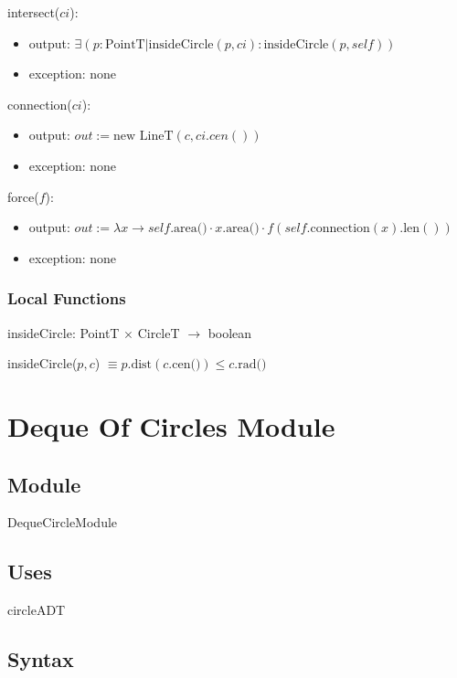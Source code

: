 \documentclass[12pt,fleqn]{article}
\begin{document}
\noindent intersect($ci$):
\begin{itemize}
\item output: $\exists ( p: \mbox{PointT} | \mbox{insideCircle}(p, ci) : \mbox{insideCircle}(p, \mathit{self}))$
\item exception: none
\end{itemize}

\noindent connection($ci$):
\begin{itemize}
\item output: $out := \mbox{new~} \mbox{LineT} (c, ci.\mathit{cen()})$
\item exception: none
\end{itemize}

\noindent force($f$):
\begin{itemize}
\item output: $out := \lambda x \rightarrow \mathit{self}.\mbox{area()} \cdot
  x.\mbox{area()} \cdot f(\mathit{self}.\mbox{connection}(x).\mbox{len}())$
\item exception: none
\end{itemize}

\subsubsection*{Local Functions}
insideCircle: PointT $\times$ CircleT $\rightarrow$ boolean

\noindent insideCircle($p, c$) $\equiv p.\mbox{dist}(c.\mbox{cen()}) \leq c.\mbox{rad()}$

\newpage

\section* {Deque Of Circles Module}

\subsection* {Module}

DequeCircleModule

\subsection* {Uses}

circleADT

\subsection* {Syntax}
\end{document}
